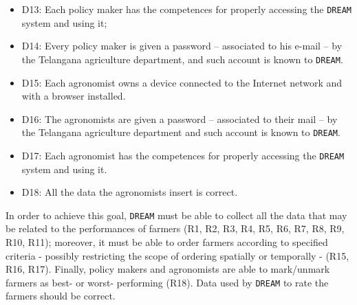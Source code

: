 \documentclass{article}
\begin{document}
\begin{itemize}
    \item D13: Each policy maker has the competences for properly accessing the \verb|DREAM| system and using it;
    
    \item D14: Every policy maker is given a password – associated to his e-mail – by the Telangana agriculture department, and such account is known to \verb|DREAM|.
  
    \item D15: Each agronomist owns a device connected to the Internet network and with a browser installed.
  
    \item D16: The agronomists are given a password – associated to their mail – by the Telangana agriculture department and such account is known to \verb|DREAM|.
  
    \item D17: Each agronomist has the competences for properly accessing the \verb|DREAM| system and using it.
   
    \item D18: All the data the agronomists insert is correct.
  
\end{itemize}

In order to achieve this goal, \verb|DREAM| must be able to collect all the data that may be related to the performances of farmers (R1, R2, R3, R4, R5, R6, R7, R8, R9, R10, R11); moreover, it must be able to order farmers according to specified criteria - possibly restricting the scope of ordering spatially or temporally - (R15, R16, R17). Finally, policy makers and agronomists are able to mark/unmark farmers as best- or worst- performing (R18).
Data used by \verb|DREAM| to rate the farmers should be correct.
\newline
\end{document}
